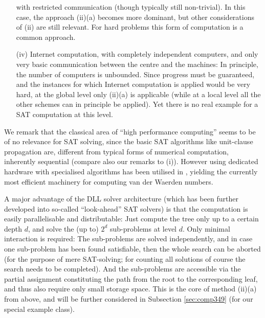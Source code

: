 \documentclass[final,3p,times]{elsarticle}
\theoremstyle{definition}
\begin{document}
\begin{enumerate}
with restricted communication (though typically still non-trivial). In this case, the approach (ii)(a) becomes more dominant,
but other considerations of (ii) are still relevant. For hard problems this form of computation is a common approach.
\item[(iv)] Internet computation, with completely independent computers, and only very basic communication between the centre and the machines: In principle, the number of computers is unbounded. Since progress must be guaranteed, and the instances for which Internet computation is applied would be very hard, at the global level only (ii)(a) is applicable (while at a local level all the other schemes can in principle be applied). Yet there is no real example for a SAT computation at this level.
\end{enumerate}
We remark that the classical area of ``high performance computing'' seems to be of no relevance for SAT solving,
since the basic SAT algorithms like unit-clause propagation are, different from typical forms of numerical computation, inherently sequential (compare also our remarks to (i)). However using dedicated hardware with specialised algorithms has been utilised in \cite{KourilPaulW26,Kouril2012W34}, yielding the currently most efficient machinery for computing van der Waerden numbers.

A major advantage of the DLL solver architecture (which has been further developed into so-called ``look-ahead'' SAT solvers) is that the computation is easily parallelisable and distributable: Just compute the tree only up to a certain depth $d$, and solve the (up to) $2^d$ sub-problems at level $d$. Only minimal interaction is required: The sub-problems are solved independently, and in case one sub-problem has been found satisfiable, then the whole search can be aborted (for the purpose of mere SAT-solving; for counting all solutions of course the search needs to be completed). And the sub-problems are accessible via the partial assignment constituting the path from the root to the corresponding leaf, and thus also require only small storage space. This is the core of method (ii)(a) from above, and will be further considered in Subsection \ref{sec:comp349} (for our special example class).
\end{document}
